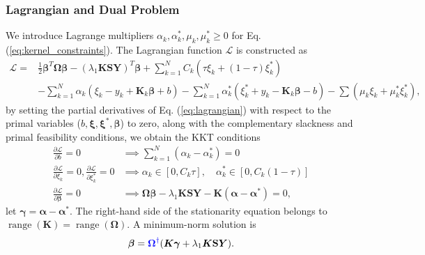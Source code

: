 \documentclass[a4paper]{cas-sc}
\begin{document}
\subsubsection{Lagrangian and Dual Problem}
We introduce Lagrange multipliers $\alpha_k, \alpha_k^*, \mu_k, \mu_k^* \ge 0$ for Eq. (\ref{eq:kernel_constraints}). The Lagrangian function $\mathcal{L}$ is constructed as
\begin{equation}
\label{eq:lagrangian}
\begin{aligned}
\mathcal{L} = &\frac{1}{2} \boldsymbol{\beta}^T \boldsymbol{\Omega} \boldsymbol{\beta} - (\lambda_1 \boldsymbol{K} \mathbf{S} \boldsymbol{Y})^T \boldsymbol{\beta} + \sum_{k=1}^N C_k (\tau \xi_k + (1-\tau)\xi_k^*) \\
&- \sum_{k=1}^N \alpha_k (\xi_k - y_k + \boldsymbol{K}_k \boldsymbol{\beta} + b) - \sum_{k=1}^N \alpha_k^* (\xi_k^* + y_k - \boldsymbol{K}_k \boldsymbol{\beta} - b) - \sum (\mu_k \xi_k + \mu_k^* \xi_k^*),
\end{aligned}
\end{equation}
by setting the partial derivatives of Eq. (\ref{eq:lagrangian}) with respect to the primal variables ($b, \boldsymbol{\xi}, \boldsymbol{\xi}^*, \boldsymbol{\beta}$) to zero, along with the complementary slackness and primal feasibility conditions, we obtain the KKT conditions
\begin{align}
    \label{eq:kkt_b} \frac{\partial \mathcal{L}}{\partial b} = 0 & \implies \sum_{k=1}^N (\alpha_k - \alpha_k^*) = 0 \\
    \label{eq:kkt_xi} \frac{\partial \mathcal{L}}{\partial \xi_k} = 0, \frac{\partial \mathcal{L}}{\partial \xi_k^*} = 0 & \implies \alpha_k \in [0, C_k \tau], \quad \alpha_k^* \in [0, C_k (1-\tau)] \\
    \label{eq:kkt_beta} \frac{\partial \mathcal{L}}{\partial \boldsymbol{\beta}} = 0 & \implies \boldsymbol{\Omega} \boldsymbol{\beta} - \lambda_1 \boldsymbol{K} \mathbf{S} \boldsymbol{Y} - \boldsymbol{K} (\boldsymbol{\alpha} - \boldsymbol{\alpha}^*) = 0,
\end{align}
let $\boldsymbol{\gamma}=\boldsymbol{\alpha}-\boldsymbol{\alpha}^*$. {\color{blue}The right-hand side of the stationarity equation belongs to $\operatorname{range}(\boldsymbol{K})=\operatorname{range}(\boldsymbol{\Omega})$. A minimum-norm solution is}
\begin{equation}
\label{eq:beta_optimal}
\boldsymbol{\beta}={\color{blue}\boldsymbol{\Omega}^{\dagger}}(\boldsymbol{K}\boldsymbol{\gamma}+\lambda_1\boldsymbol{K}\mathbf{S}\boldsymbol{Y}).
\end{equation}
\end{document}
